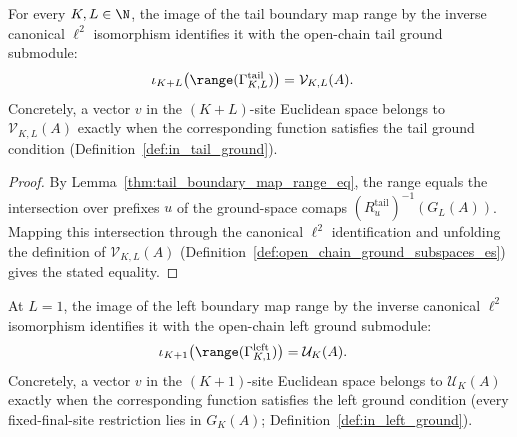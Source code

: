 \begin{lemma}\label{thm:tail_boundary_map_range_es_transport}
    \leanok
    For every $K,L\in\N$, the image of the tail boundary map range by the
    inverse canonical $\ell^2$ isomorphism
    identifies it with the open-chain tail ground submodule:
    \begin{align}
        \iota_{K+L}\bigl(\range(\Gamma^{\mathrm{tail}}_{K,L})\bigr)
         & =\mathcal V_{K,L}(A).
    \end{align}
    Concretely, a vector $v$ in the $(K+L)$-site Euclidean space belongs to
    $\mathcal V_{K,L}(A)$ exactly when the corresponding function satisfies the
    tail ground condition (Definition~\ref{def:in_tail_ground}).
\end{lemma}

\begin{proof}
    \leanok
    By Lemma~\ref{thm:tail_boundary_map_range_eq}, the range equals the
    intersection over prefixes $u$ of the ground-space comaps
    $(R^{\mathrm{tail}}_u)^{-1}(G_L(A))$.  Mapping this intersection
    through the canonical $\ell^2$ identification and unfolding the definition
    of $\mathcal V_{K,L}(A)$ (Definition~\ref{def:open_chain_ground_subspaces_es})
    gives the stated equality.
\end{proof}

\begin{lemma}[Left boundary map range: Euclidean-space image ($L=1$)]%
    \label{thm:left_boundary_map_range_es_transport}
    \leanok
    At $L=1$, the image of the left boundary map range by the inverse canonical
    $\ell^2$ isomorphism identifies
    it with the open-chain left ground submodule:
    \begin{align}
        \iota_{K+1}\bigl(\range(\Gamma^{\mathrm{left}}_{K,1})\bigr)
         & =\mathcal U_K(A).
    \end{align}
    Concretely, a vector $v$ in the $(K+1)$-site Euclidean space belongs to
    $\mathcal U_K(A)$ exactly when the corresponding function satisfies the
    left ground condition (every fixed-final-site restriction lies in $G_K(A)$;
    Definition~\ref{def:in_left_ground}).
\end{lemma}

